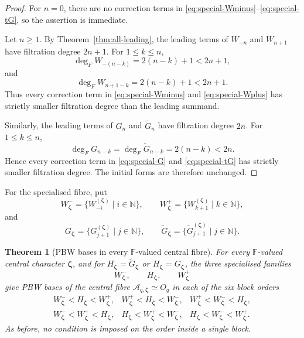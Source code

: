 \documentclass[11pt]{extarticle}
\newtheorem{theorem}{Theorem}[section]
\theoremstyle{definition}
\theoremstyle{remark}
\numberwithin{equation}{section}
\newcommand{\F}{\mathbb F}
\newcommand{\N}{\mathbb N}
\newcommand{\Oq}{O_q}
\newcommand{\Aqfib}[1]{\mathcal A_{q,#1}}
\begin{document}
\begin{proof}
For \(n=0\), there are no correction terms in
\eqref{eq:special-Wminus}--\eqref{eq:special-tG}, so the assertion is
immediate.

Let \(n\geq1\).  By Theorem~\ref{thm:all-leading}, the leading terms of
\(W_{-n}\) and \(W_{n+1}\) have filtration degree \(2n+1\).  For
\(1\leq k\leq n\),
\[
        \deg_F W_{-(n-k)}=2(n-k)+1<2n+1,
\]
and
\[
        \deg_F W_{n+1-k}=2(n-k)+1<2n+1 .
\]
Thus every correction term in
\eqref{eq:special-Wminus} and \eqref{eq:special-Wplus} has strictly smaller
filtration degree than the leading summand.

Similarly, the leading terms of \(G_n\) and \(\widetilde G_n\) have
filtration degree \(2n\).  For \(1\leq k\leq n\),
\[
        \deg_F G_{n-k}=\deg_F\widetilde G_{n-k}=2(n-k)<2n .
\]
Hence every correction term in \eqref{eq:special-G} and
\eqref{eq:special-tG} has strictly smaller filtration degree.  The initial
forms are therefore unchanged.
\end{proof}

For the specialised fibre, put
\[
 W^-_{\boldsymbol\zeta}
 =
 \{W_{-i}^{(\boldsymbol\zeta)}\mid i\in\N\},
 \qquad
 W^+_{\boldsymbol\zeta}
 =
 \{W_{k+1}^{(\boldsymbol\zeta)}\mid k\in\N\},
\]
and
\[
 G_{\boldsymbol\zeta}
 =
 \{G_{j+1}^{(\boldsymbol\zeta)}\mid j\in\N\},
 \qquad
 \widetilde G_{\boldsymbol\zeta}
 =
 \{\widetilde G_{j+1}^{(\boldsymbol\zeta)}\mid j\in\N\}.
\]

\begin{theorem}[PBW bases in every $\F$-valued central fibre]
\label{thm:central-fibre-PBW}
For every $\F$-valued central character \(\boldsymbol\zeta\), and for
\(H_{\boldsymbol\zeta}=\widetilde G_{\boldsymbol\zeta}\) or
\(H_{\boldsymbol\zeta}=G_{\boldsymbol\zeta}\), the three specialised
families
\[
        W^-_{\boldsymbol\zeta},
        \qquad
        H_{\boldsymbol\zeta},
        \qquad
        W^+_{\boldsymbol\zeta}
\]
give PBW bases of the central fibre \(\Aqfib{\boldsymbol\zeta}\simeq\Oq\) in
each of the six block orders
\[
\begin{array}{lll}
W^-_{\boldsymbol\zeta}<H_{\boldsymbol\zeta}<W^+_{\boldsymbol\zeta},&
W^+_{\boldsymbol\zeta}<H_{\boldsymbol\zeta}<W^-_{\boldsymbol\zeta},&
W^+_{\boldsymbol\zeta}<W^-_{\boldsymbol\zeta}<H_{\boldsymbol\zeta},\\[1mm]
W^-_{\boldsymbol\zeta}<W^+_{\boldsymbol\zeta}<H_{\boldsymbol\zeta},&
H_{\boldsymbol\zeta}<W^+_{\boldsymbol\zeta}<W^-_{\boldsymbol\zeta},&
H_{\boldsymbol\zeta}<W^-_{\boldsymbol\zeta}<W^+_{\boldsymbol\zeta}.
\end{array}
\]
As before, no condition is imposed on the order inside a single block.
\end{theorem}
\end{document}
